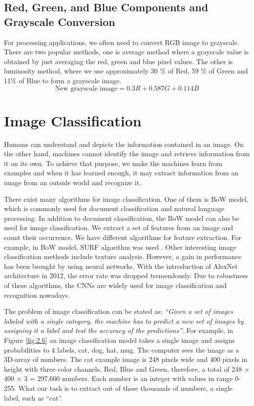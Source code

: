 \subsection{Red, Green, and Blue Components and Grayscale Conversion}

For processing applications, we often need to convert RGB image to grayscale. There are two popular methods, one is average method where a grayscale value is obtained by just averaging the red, green and blue pixel values. The other is luminosity method, where we use approximately 30 \% of Red, 59 \% of Green and
11\% of Blue to form a grayscale image.
\begin{equation}
	\mbox{New grayscale image} = 0.3R + 0.587G + 0.114B
\end{equation}
\section{Image Classification}
Humans can understand and depicts the information contained in an image. On the other 
hand, machines cannot identify the image and retrieve information from it on its own. To 
achieve that purpose, we make the machines learn from examples and when it has learned 
enough, it may extract information from an image from an outside world and recognize it.

There exist many algorithms for image classification. One of them is BoW 
model, which is commonly used for document classification and natural language 
processing. In addition to document classification, the BoW model can also be used for 
image classification. We extract a set of features from an image and count 
their occurrence. We have different algorithms for feature extraction. For example, in 
BoW model, SURF algorithm was used \cite{chap_2_article:8}. Other interesting image 
classification methods include texture analysis. However, a gain in performance has been 
brought by using neural networks. With the introduction of AlexNet architecture in 
2012, the error rate was dropped tremendously. Due to robustness of these 
algorithms, the CNNs are widely used for 
image classification and recognition nowadays. 

The problem of image classification can be stated as: \textit{“Given a set of 
images labeled with a single category, the machine has to predict a new set 
of images by assigning it a label and test the accuracy of the predictions”}. For 
example, in Figure \ref{fig:2.6} an image classification model takes a single image and assigns 
probabilities to 4 labels, {cat, dog, hat, mug}. The computer sees the image as a 
3D-array of numbers. The cat example image is 248 pixels wide and 400 pixels in height 
with three color channels, Red, Blue and Green, therefore, a total 
of 248 $\times$ 400 $\times$ 3  = 297,600 numbers. Each number is an integer with values 
in range 0-255. What our task is to extract out of these 
thousands of numbers, a single label, such as “cat”. 

